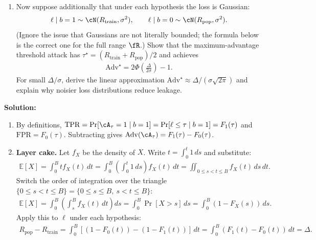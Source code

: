 \documentclass[12pt]{article}
\renewcommand{\fE}{\mathbb{E}}
\begin{document}
\begin{enumerate}
\begin{enumerate}
    \item Now suppose additionally that under each hypothesis the loss is Gaussian:
    \begin{align*}
        \ell \mid b=1 \sim \cN(R_{\mathrm{train}}, \sigma^2), \qquad \ell \mid b=0 \sim \cN(R_{\mathrm{pop}}, \sigma^2).
    \end{align*}
    (Ignore the issue that Gaussians are not literally bounded; the formula below is the correct one for the full range $\fR$.) Show that the maximum-advantage threshold attack has $\tau^\star = (R_{\mathrm{train}} + R_{\mathrm{pop}})/2$ and achieves
    \begin{align*}
        \mathrm{Adv}^\star = 2\Phi\!\left(\frac{\Delta}{2\sigma}\right) - 1.
    \end{align*}
    For small $\Delta/\sigma$, derive the linear approximation $\mathrm{Adv}^\star \approx \Delta/(\sigma\sqrt{2\pi})$ and explain why noisier loss distributions reduce leakage.
\end{enumerate}

\begin{solution}
{\bf Solution:}\\
\begin{enumerate}
    \item By definitions, $\mathrm{TPR} = \Pr[\cA_\tau = 1 \mid b = 1] = \Pr[\ell \le \tau \mid b = 1] = F_1(\tau)$ and $\mathrm{FPR} = F_0(\tau)$. Subtracting gives $\mathrm{Adv}(\cA_\tau) = F_1(\tau) - F_0(\tau)$.

    \item \textbf{Layer cake.} Let $f_X$ be the density of $X$. Write $t = \int_0^t 1\,ds$ and substitute:
    \begin{align*}
        \fE[X] = \int_0^B t f_X(t)\,dt = \int_0^B \!\!\left(\int_0^t 1\,ds\right) f_X(t)\,dt = \iint_{0 \le s < t \le B} f_X(t)\,ds\,dt.
    \end{align*}
    Switch the order of integration over the triangle $\{0 \le s < t \le B\} = \{0 \le s \le B,\ s < t \le B\}$:
    \begin{align*}
        \fE[X] = \int_0^B \!\!\left(\int_s^B f_X(t)\,dt\right) ds = \int_0^B \Pr[X > s]\,ds = \int_0^B (1 - F_X(s))\,ds.
    \end{align*}
    Apply this to $\ell$ under each hypothesis:
    \begin{align*}
        R_{\mathrm{pop}} - R_{\mathrm{train}} = \int_0^B [(1 - F_0(t)) - (1 - F_1(t))]\,dt = \int_0^B (F_1(t) - F_0(t))\,dt = \Delta.
    \end{align*}


\end{enumerate}
\end{solution}
\end{enumerate}
\end{document}
